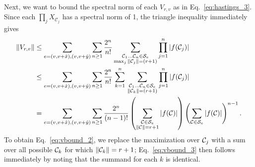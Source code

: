 Next, we want to bound the spectral norm of each $V_{r,v}$ as in Eq.~\eqref{eq:hastings_3}. Since each $\prod_j X_{\mathcal{C}_j}$ has a spectral norm of 1, the triangle inequality immediately gives
\begin{subequations}
\label{eq:vbound_app}
\begin{align}
    \norm{V_{r,v}} &\leq  \sum_{e = \left( v,v+\hat{x} \right),\left( v, v+\hat{y} \right)} \sum_{n \geq 1}  \frac{2^n}{n!} \sum_{\substack{\mathcal{C}_1 \dots \mathcal{C}_n \in \mathcal{S}_e  \\ \max_j \norm{\mathcal{C}_j} = (r+1)}} \prod_{j=1}^n { \abs{f(\mathcal{C}_j)} } \\
    &\leq  \sum_{e = \left( v,v+\hat{x} \right),\left( v, v+\hat{y} \right)} \sum_{n \geq 1}  \frac{2^n}{n!} \,  \sum_{k=1}^n \, \sum_{\substack{\mathcal{C}_1 \dots \mathcal{C}_n \in \mathcal{S}_e \\ \norm{\mathcal{C}_k} = (r+1)}} \prod_{j=1}^n {\abs{f(\mathcal{C}_j)} } \label{eq:vbound_2} \\
    &=  \sum_{e = \left( v,v+\hat{x} \right),\left( v, v+\hat{y} \right)} \sum_{n \geq 1}  \frac{2^n}{(n-1)!} \left(  \sum_{\substack{\mathcal{C} \in \mathcal{S}_e \\ \norm{\mathcal{C}} = r+1}} \abs{f(\mathcal{C})} \right) \left(  \sum_{\mathcal{C} \in \mathcal{S}_e}  \abs{f(\mathcal{C})} \right)^{n-1} . \label{eq:vbound_3}
\end{align}
\end{subequations}
To obtain Eq.~\eqref{eq:vbound_2}, we replace the maximization over $\mathcal{C}_j$ with a sum over all possible $\mathcal{C}_k$ for which $\norm{\mathcal{C}_k} = r + 1$; Eq.~\eqref{eq:vbound_3} then follows immediately by noting that the summand for each $k$ is identical.

